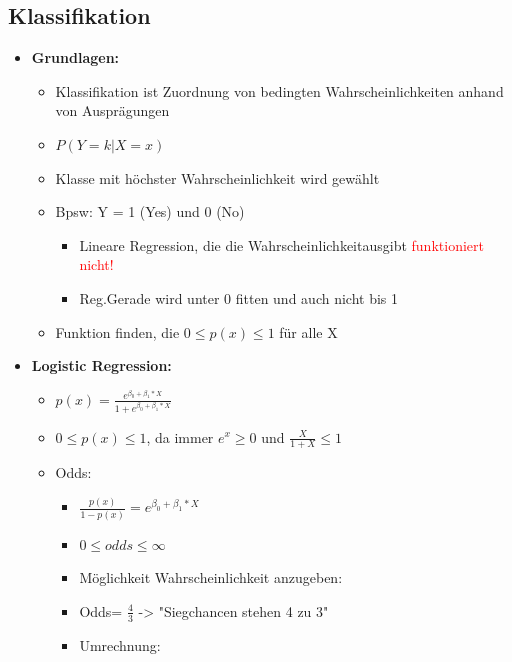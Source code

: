 \documentclass[a4paper]{article}
\begin{document}
\begin{landscape}
\begin{multicols}{3}
        \section{Klassifikation}
        \begin{itemize}[noitemsep,nolistsep,leftmargin=*]
            \item \textbf{Grundlagen:}
            \begin{itemize}[noitemsep,nolistsep,leftmargin=*]
                \item Klassifikation ist Zuordnung von bedingten Wahrscheinlichkeiten anhand von Ausprägungen
                \item $P(Y = k | X=x)$
                \item Klasse mit höchster Wahrscheinlichkeit wird gewählt
                \item Bpsw: Y = 1 (Yes) und 0 (No)
                \begin{itemize}[noitemsep,nolistsep,leftmargin=*]
                    \item Lineare Regression, die die Wahrscheinlichkeitausgibt \textcolor{red}{funktioniert nicht!}
                    \item Reg.Gerade wird unter 0 fitten und auch nicht bis 1
                \end{itemize}
                \item Funktion finden, die $0 \leq p(x) \leq 1$ für alle X
            \end{itemize}
            \item \textbf{Logistic Regression:}
            \begin{itemize}[noitemsep,nolistsep,leftmargin=*]
                \item $p(x) = \frac{e^{\beta_0+\beta_1*X}}{1+e^{\beta_0+\beta_1*X}}$
                \item $0 \leq p(x) \leq 1$, da immer $e^x \geq 0$ und $\frac{X}{1+X}\leq 1$
                \item Odds:
                \begin{itemize}[noitemsep,nolistsep,leftmargin=*]
                    \item $\frac{p(x)}{1-p(x)}= e^{\beta_0+\beta_1*X}$
                    \item $0 \leq odds \leq \infty$
                    \item Möglichkeit Wahrscheinlichkeit anzugeben:
                    \item Odds= $\frac{4}{3}$ -> "Siegchancen stehen 4 zu 3"
                    \item Umrechnung:

\end{itemize}
\end{itemize}
\end{itemize}
\end{multicols}
\end{landscape}
\end{document}
